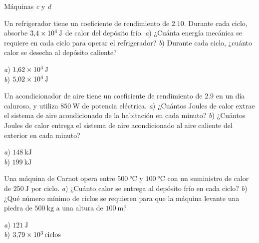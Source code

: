 \begin{Answer}
	\begin{minipage}[t]{.4\textwidth}
    Máquinas \textit{c} y \textit{d}
  \end{minipage}
\end{Answer}
%
\begin{Exercise}
  Un refrigerador tiene un coeficiente de rendimiento de $2.10$. Durante cada ciclo, absorbe $\SI{3.4E4}{\joule}$ de calor del depósito frío. \textit{a}) ¿Cuánta energía mecánica se requiere en cada ciclo para operar el refrigerador? \textit{b}) Durante cada ciclo, ¿cuánto calor se desecha al depósito caliente?
\end{Exercise}
\begin{Answer}
	\begin{minipage}[t]{.4\textwidth}
    \textit{a}) $\SI{1.62E4}{\joule}$\\ \textit{b}) $\SI{5.02E4}{\joule}$
  \end{minipage}
\end{Answer}
%
\begin{Exercise}
  Un acondicionador de aire tiene un coeficiente de rendimiento de $2.9$ en un día caluroso, y utiliza $\SI{850}{\watt}$ de potencia eléctrica. \textit{a}) ¿Cuántos Joules de calor extrae el sistema de aire acondicionado de la habitación en cada minuto? \textit{b}) ¿Cuántos Joules de calor entrega el sistema de aire acondicionado al aire caliente del exterior en cada minuto?
\end{Exercise}
\begin{Answer}
	\begin{minipage}[t]{.4\textwidth}
    \textit{a}) $\SI{148}{\kilo\joule}$\\ \textit{b}) $\SI{199}{\kilo\joule}$
  \end{minipage}
\end{Answer}
%
\begin{Exercise}
  {}{}
  Una máquina de Carnot opera entre $\SI{500}{\celsius}$ y $\SI{100}{\celsius}$ con un suministro de calor de $\SI{250}{\joule}$ por ciclo. \textit{a}) ¿Cuánto calor se entrega al depósito frío en cada ciclo? \textit{b}) ¿Qué número mínimo de ciclos se requieren para que la máquina levante una piedra de $\SI{500}{\kilogram}$ a una altura de $\SI{100}{\metre}$?
\end{Exercise}
\begin{Answer}
	\begin{minipage}[t]{.4\textwidth}
    \textit{a}) $\SI{121}{\joule}$\\ \textit{b}) $\SI{3.79E3}{ciclos}$
  \end{minipage}
\end{Answer}
